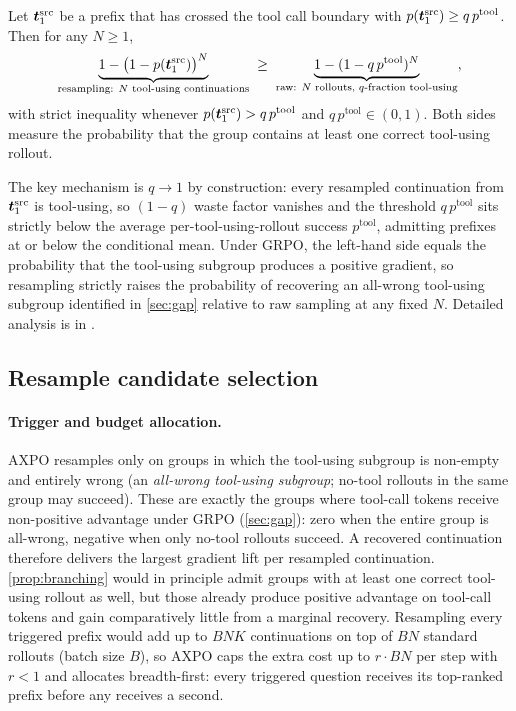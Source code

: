 \begin{proposition}
\label{prop:branching}
Let ${\bm{t}}_1^{\text{src}}$ be a prefix that has crossed the tool call boundary with $p({\bm{t}}_1^{\text{src}}) \geq q\, p^{\text{tool}}$. Then for any $N \geq 1$,
\vspace{-0.05in}
\begin{equation}
    \underbrace{1 - \bigl(1 - p({\bm{t}}_1^{\text{src}})\bigr)^N}_{\text{resampling: $N$ tool-using continuations}}
    \;\geq\;
    \underbrace{1 - (1 - q\, p^{\text{tool}})^N}_{\text{raw: $N$ rollouts, $q$-fraction tool-using}},
\end{equation}
with strict inequality whenever $p({\bm{t}}_1^{\text{src}}) > q\, p^{\text{tool}}$ and $q\, p^{\text{tool}} \in (0,1)$. Both sides measure the probability that the group contains at least one correct tool-using rollout.
\end{proposition}

The key mechanism is $q \to 1$ by construction: every resampled continuation from ${\bm{t}}_1^{\text{src}}$ is tool-using, so $(1-q)$ waste factor vanishes and the threshold $q\, p^{\text{tool}}$ sits strictly below the average per-tool-using-rollout success $p^{\text{tool}}$, admitting prefixes at or below the conditional mean. Under GRPO, the left-hand side equals the probability that the tool-using subgroup produces a positive gradient, so resampling strictly raises the probability of recovering an all-wrong tool-using subgroup identified in \autoref{sec:gap} relative to raw sampling at any fixed $N$. Detailed analysis is in .

\subsection{Resample candidate selection}
\label{sec:selection}

\paragraph{Trigger and budget allocation.}
AXPO resamples only on groups in which the tool-using subgroup is non-empty and entirely wrong (an \emph{all-wrong tool-using subgroup}; no-tool rollouts in the same group may succeed). These are exactly the groups where tool-call tokens receive non-positive advantage under GRPO (\autoref{sec:gap}): zero when the entire group is all-wrong, negative when only no-tool rollouts succeed. A recovered continuation therefore delivers the largest gradient lift per resampled continuation. \autoref{prop:branching} would in principle admit groups with at least one correct tool-using rollout as well, but those already produce positive advantage on tool-call tokens and gain comparatively little from a marginal recovery. Resampling every triggered prefix would add up to $BNK$ continuations on top of $BN$ standard rollouts (batch size $B$), so AXPO caps the extra cost up to $r \cdot BN$ per step with $r < 1$ and allocates breadth-first: every triggered question receives its top-ranked prefix before any receives a second.


